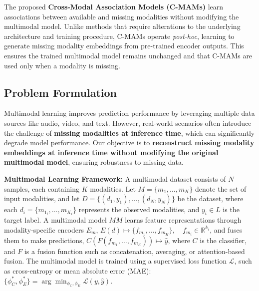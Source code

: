 The proposed \textbf{Cross-Modal Association Models (C-MAMs)} learn associations between available and missing modalities without modifying the multimodal model. Unlike methods that require alterations to the underlying architecture and training procedure, C-MAMs operate \textit{post-hoc}, learning to generate missing modality embeddings from pre-trained encoder outputs. This ensures the trained multimodal model remains unchanged and that C-MAMs are used only when a modality is missing.


\subsection{Problem Formulation}
Multimodal learning improves prediction performance by leveraging multiple data sources like audio, video, and text. However, real-world scenarios often introduce the challenge of \textbf{missing modalities at inference time}, which can significantly degrade model performance. Our objective is to \textbf{reconstruct missing modality embeddings at inference time without modifying the original multimodal model}, ensuring robustness to missing data.

\textbf{Multimodal Learning Framework:} A multimodal dataset consists of $N$ samples, each containing $K$ modalities. Let $M = \{m_1, \dots, m_K\}$ denote the set of input modalities, and let $D = \{(d_1, y_1), \dots, (d_N, y_N)\}$ be the dataset, where each $d_i = \{m_{1_i}, \dots, m_{K_i}\}$ represents the observed modalities, and $y_i \in L$ is the target label. A multimodal model $MM$ learns feature representations through modality-specific encoders $E_m$, $E(d) \mapsto \{f_{m_1}, \dots, f_{m_K}\}, \quad f_{m_i} \in \mathbb{R}^{k_i}$, and fuses them to make predictions, $C(F(f_{m_1}, \dots, f_{m_K})) \mapsto \hat{y}$, where $C$ is the classifier, and $F$ is a fusion function such as concatenation, averaging, or attention-based fusion. The multimodal model is trained using a supervised loss function $\mathcal{L}$, such as cross-entropy or mean absolute error (MAE): $\{\phi_C^*, \phi_E^*\} = \arg\min_{\phi_C, \phi_E} \mathcal{L}(y, \hat{y})$.

